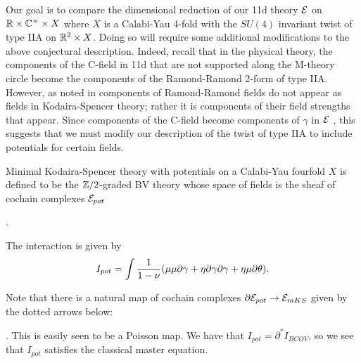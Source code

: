 
Our goal is to compare the dimensional reduction of our 11d theory $\mathcal E$ on $\mathbb{R}\times \mathbb{C}^{\times}\times X$ where $X$ is a Calabi-Yau 4-fold with the $SU(4)$ invariant twist of type IIA on $\mathbb{R}^{2}\times X$. Doing so will require some additional modifications to the above conjectural description. Indeed, recall that in the physical theory, the components of the C-field in 11d that are not supported along the M-theory circle become the components of the Ramond-Ramond 2-form of type IIA. However, as noted in \cite{CLSugra} components of Ramond-Ramond fields do not appear as fields in Kodaira-Spencer theory; rather it is components of their field strengths that appear. Since components of the C-field become components of $\gamma$ in $\mathcal E$ , this suggests that we must modify our description of the twist of type IIA to include potentials for certain fields.

Minimal Kodaira-Spencer theory with potentials on a Calabi-Yau fourfold $X$ is defined to be the $\mathbb{Z}/2$-graded BV theory whose space of fields is the sheaf of cochain complexes $\mathcal E_{pot}$
\beqn
{}
\eeqn.

The interaction is given by \[I_{pot} = \int \frac{1}{1-\nu}(\mu\mu\partial\gamma + \eta\partial\gamma\partial\gamma + \eta\mu\partial\theta).\]


Note that there is a natural map of cochain complexes $\partial \mathcal E_{pot}\to \mathcal E_{mKS}$ given by the dotted arrows below:
\beqn
{}.
\eeqn
This is easily seen to be a Poisson map. We have that $I_{pot} = \partial^{*}I_{BCOV}$, so we see that $I_{pot}$ satisfies the classical master equation.

